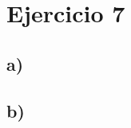 \documentclass{article}
\begin{document}
    \section*{Ejercicio 7}

    \subsection*{a)}
    

    \subsection*{b)}
    
\end{document}

